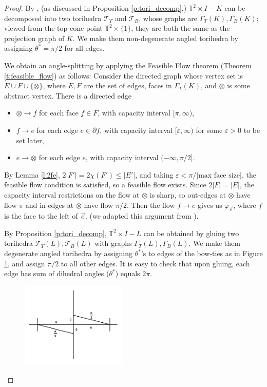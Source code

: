 \documentclass[11pt]{amsart}
\newcommand{\thmref}[1]{Theorem \ref{#1}}
\newcommand{\prpref}[1]{Proposition \ref{#1}}
\newcommand{\lemref}[1]{Lemma \ref{#1}}
\newcommand{\figref}[1]{Figure \ref{#1}}
\newcommand{\torus}{{\mathbb{T}^2}}
\newcommand{\sT}{{\mathcal{T}}}
\newcommand{\del}{\partial}
\newcommand{\vphi}{\varphi}
\newcommand{\veps}{\varepsilon}
\newcommand{\toruscomp}[1]{{\torus \times I - #1}}
\theoremstyle{plain}
\theoremstyle{definition}
\begin{document}
\begin{proof}
By \cite[Theorem 7.5]{CKP2},
(as discussed in \prpref{p:tori_decomp},)
$\toruscomp{K}$ can be decomposed
into two torihedra $\sT_T$ and $\sT_B$,
whose graphs are $\Gamma_T(K), \Gamma_B(K)$;
viewed from the top cone point $\torus \times \{1\}$,
they are both the same as the projection graph of $K$.
We make them non-degenerate angled torihedra by assigning $\theta^* = \pi/2$
for all edges.

We obtain an angle-splitting by applying the
Feasible Flow theorem (\thmref{t:feasible_flow}) as follows:
Consider the directed graph whose vertex set is
$E \cup F \cup \{\otimes\}$,
where $E, F$ are the set of edges, faces in $\Gamma_T(K)$,
and $\otimes$ is some abstract vertex.
There is a directed edge
\begin{itemize}
\item $\otimes \to f$ for each face $f\in F$, with capacity interval
	$[\pi, \infty)$,
\item $f \to e$ for each edge $e \in \del f$,
	with capacity interval $[\veps, \infty)$
	for some $\veps>0$ to be set later,
\item $e \to \otimes$ for each edge $e$, with capacity interval
	$(-\infty, \pi/2]$.
\end{itemize}
By \lemref{l:2fe}, $2|F'| = 2\chi(F') \leq |E'|$,
and taking $\veps < \pi / |\text{max face size}|$,
the feasible flow condition is satisfied,
so a feasible flow exists.
Since $2|F| = |E|$, the capacity interval restrictions
on the flow at $\otimes$ is sharp, so out-edges at $\otimes$
have flow $\pi$ and in-edges at $\otimes$ have flow $\pi/2$.
Then the flow $f \to e$ gives us $\vphi_{\vec{e}}$,
where $f$ is the face to the left of $\vec{e}$.
(we adapted this argument from \cite{BandS}).


By \prpref{p:tori_decomp}, $\toruscomp{L}$ can be
obtained by gluing two torihedra $\sT_T(L),\sT_B(L)$
with graphs $\Gamma_T(L),\Gamma_B(L)$.
We make them degenerate angled torihedra by assigning $\theta^*$'s
to edges of the bow-ties as in \figref{f:bowtie_angles},
and assign $\pi/2$ to all other edges.
It is easy to check that upon gluing,
each edge has sum of dihedral angles ($\theta^*$) equals $2\pi$.


\begin{figure}
\label{f:bowtie_angles}
\includegraphics[width=5cm]{more_pictures/horizontal_bowtie.png}
\end{figure}



\end{proof}
\end{document}
